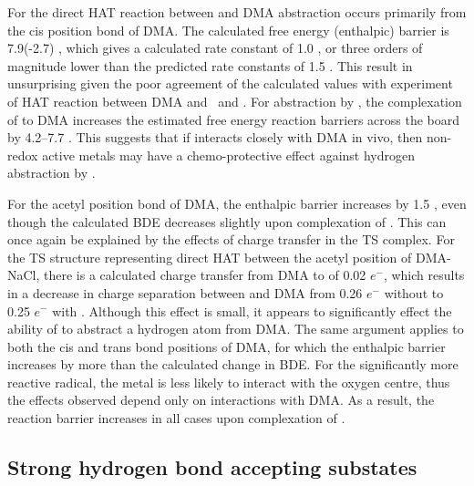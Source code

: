 \begin{doublespace}
For the direct HAT reaction between  and DMA abstraction occurs
primarily from the cis position  bond of DMA. The calculated free energy
(enthalpic) barrier is 7.9(-2.7) \kcalmol, which gives a calculated rate
constant of 1.0  \Ms, or three orders of magnitude lower than the predicted
rate constants of 1.5  \Ms. This result in unsurprising given the poor
agreement of the calculated values with experiment of HAT reaction between DMA
and \bno\ and \cumo. For abstraction by , the complexation of 
to DMA increases the estimated free energy reaction barriers across the board by
4.2--7.7 \kcalmol. This suggests that if  interacts closely with DMA in
vivo, then non-redox active metals may have a chemo-protective effect against
hydrogen abstraction by .

For the acetyl position  bond of DMA, the enthalpic barrier increases by
1.5 \kcalmol, even though the calculated BDE decreases slightly upon
complexation of . This can once again be explained by the effects of
charge transfer in the TS complex. For the TS structure representing direct HAT
between  the acetyl position of DMA-NaCl, there is a calculated charge
transfer from DMA to  of 0.02 $e^-$, which results in a decrease in
charge separation between  and DMA from 0.26 $e^-$ without  to
0.25 $e^-$ with . Although this effect is small, it appears to
significantly effect the ability of  to abstract a hydrogen atom from
DMA. The same argument applies to both the cis and trans  bond positions
of DMA, for which the enthalpic barrier increases by more than the calculated
change in BDE. For the significantly more reactive  radical, the metal
is less likely to interact with the oxygen centre, thus the effects observed
depend only on interactions with DMA. As a result, the reaction barrier
increases in all cases upon complexation of .

\subsection{Strong hydrogen bond accepting substates}


\end{doublespace}
